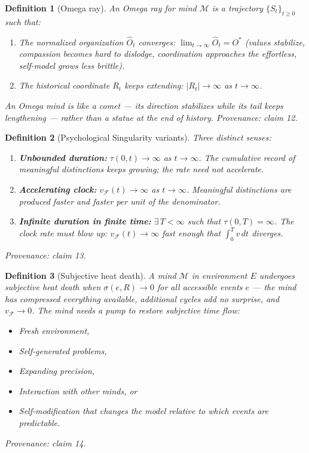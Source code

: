 \documentclass[11pt]{article}
\newtheorem{definition}{Definition}
\begin{document}
\begin{definition}[Omega ray]
\label{def:omegaray}
An \emph{Omega ray} for mind $\mathcal{M}$ is a trajectory $\{S_t\}_{t \geq 0}$ such that:
\begin{enumerate}
  \item The \emph{normalized organization} $\hat{O}_t$ converges:
        $\lim_{t\to\infty} \hat{O}_t = O^*$ (values stabilize, compassion becomes hard to dislodge, coordination approaches the effortless, self-model grows less brittle).
  \item The \emph{historical coordinate} $R_t$ keeps extending:
        $|R_t| \to \infty$ as $t \to \infty$.
\end{enumerate}
An Omega mind is like a comet --- its direction stabilizes while its tail keeps lengthening --- rather than a statue at the end of history.
\emph{Provenance: claim 12.}
\end{definition}

\begin{definition}[Psychological Singularity variants]
\label{def:psych-sing}
Three distinct senses:
\begin{enumerate}
  \item \textbf{Unbounded duration:} $\tau(0,t) \to \infty$ as $t \to \infty$. The cumulative record of meaningful distinctions keeps growing; the rate need not accelerate.
  \item \textbf{Accelerating clock:} $v_{\mathcal{F}}(t) \to \infty$ as $t \to \infty$. Meaningful distinctions are produced faster and faster per unit of the denominator.
  \item \textbf{Infinite duration in finite time:} $\exists\, T < \infty$ such that $\tau(0,T) = \infty$. The clock rate must blow up: $v_{\mathcal{F}}(t) \to \infty$ fast enough that $\int_0^T v\,dt$ diverges.
\end{enumerate}
\emph{Provenance: claim 13.}
\end{definition}

\begin{definition}[Subjective heat death]
\label{def:heatdeath}
A mind $\mathcal{M}$ in environment $E$ undergoes \emph{subjective heat death} when $\sigma(e, R) \to 0$ for all accessible events $e$ --- the mind has compressed everything available, additional cycles add no surprise, and $v_{\mathcal{F}} \to 0$. The mind needs a \emph{pump} to restore subjective time flow:
\begin{itemize}
  \item Fresh environment,
  \item Self-generated problems,
  \item Expanding precision,
  \item Interaction with other minds, or
  \item Self-modification that changes the model relative to which events are predictable.
\end{itemize}
\emph{Provenance: claim 14.}
\end{definition}
\end{document}
